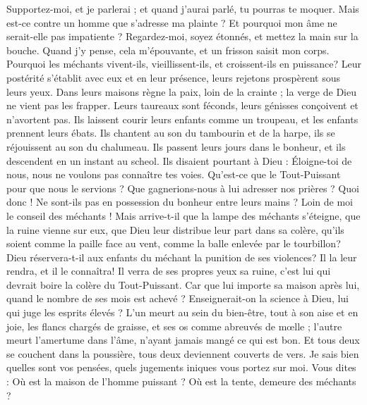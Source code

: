\begin{multicols}{2}
Supportez-moi, et je parlerai ; et quand j'aurai parlé, tu pourras te moquer.
Mais est-ce contre un homme que s'adresse ma plainte ? Et pourquoi mon âme ne serait-elle pas impatiente ?
Regardez-moi, soyez étonnés, et mettez la main sur la bouche.
Quand j'y pense, cela m'épouvante, et un frisson saisit mon corps.
Pourquoi les méchants vivent-ils, vieillissent-ils, et croissent-ils en puissance?
Leur postérité s'établit avec eux et en leur présence, leurs rejetons prospèrent sous leurs yeux.
Dans leurs maisons règne la paix, loin de la crainte ; la verge de Dieu ne vient pas les frapper.
Leurs taureaux sont féconds, leurs génisses conçoivent et n'avortent pas.
Ils laissent courir leurs enfants comme un troupeau, et les enfants prennent leurs ébats.
Ils chantent au son du tambourin et de la harpe, ils se réjouissent au son du chalumeau.
Ils passent leurs jours dans le bonheur, et ils descendent en un instant au scheol.
Ils disaient pourtant à Dieu : Éloigne-toi de nous, nous ne voulons pas connaître tes voies.
Qu'est-ce que le Tout-Puissant pour que nous le servions ? Que gagnerions-nous à lui adresser nos prières ?
Quoi donc ! Ne sont-ils pas en possession du bonheur entre leurs mains ? Loin de moi le conseil des méchants !
Mais arrive-t-il que la lampe des méchants s'éteigne, que la ruine vienne sur eux, que Dieu leur distribue leur part dans sa colère,
qu'ils soient comme la paille face au vent, comme la balle enlevée par le tourbillon?
Dieu réservera-t-il aux enfants du méchant la punition de ses violences? Il la leur rendra, et il le connaîtra!
Il verra de ses propres yeux sa ruine, c'est lui qui devrait boire la colère du Tout-Puissant.
Car que lui importe sa maison après lui, quand le nombre de ses mois est achevé ?
Enseignerait-on la science à Dieu, lui qui juge les esprits élevés ?
L'un meurt au sein du bien-être, tout à son aise et en joie,
les flancs chargés de graisse, et ses os comme abreuvés de mœlle ;
l'autre meurt l'amertume dans l'âme, n'ayant jamais mangé ce qui est bon.
Et tous deux se couchent dans la poussière, tous deux deviennent couverts de vers.
Je sais bien quelles sont vos pensées, quels jugements iniques vous portez sur moi.
Vous dites : Où est la maison de l'homme puissant ? Où est la tente, demeure des méchants ?

\end{multicols}
